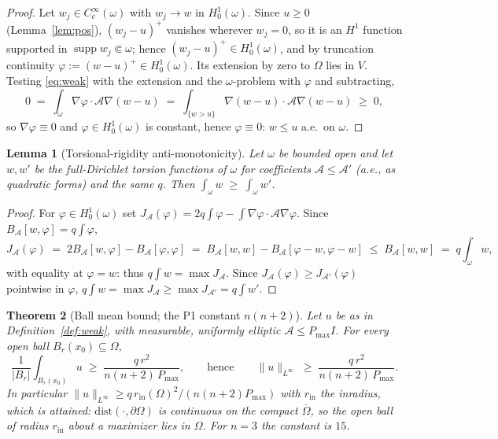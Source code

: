 \documentclass[10pt]{article}
\newtheorem{theorem}{Theorem}[section]
\newtheorem{lemma}[theorem]{Lemma}
\theoremstyle{remark}
\newcommand{\A}{\mathcal{A}}
\newcommand{\Om}{\Omega}
\newcommand{\Pmax}{P_{\max}}
\newcommand{\norminf}[1]{\|#1\|_{L^\infty}}
\begin{document}
\begin{proof}
Let $w_j\in C_c^\infty(\omega)$ with $w_j\to w$ in $H^1_0(\omega)$. Since
$u\ge0$ (Lemma~\ref{lem:pos}), $(w_j-u)^+$ vanishes wherever $w_j=0$, so it is
an $H^1$ function supported in $\operatorname{supp}w_j\Subset\omega$; hence
$(w_j-u)^+\in H^1_0(\omega)$, and by truncation continuity
$\varphi:=(w-u)^+\in H^1_0(\omega)$. Its extension by zero to $\Om$ lies in
$V$. Testing \eqref{eq:weak} with the extension and the $\omega$-problem with
$\varphi$ and subtracting,
\[
0\;=\;\int_\omega\nabla\varphi\cdot\A\nabla(w-u)
\;=\;\int_{\{w>u\}}\nabla(w-u)\cdot\A\nabla(w-u)\;\ge\;0,
\]
so $\nabla\varphi\equiv0$ and $\varphi\in H^1_0(\omega)$ is constant, hence
$\varphi\equiv0$: $w\le u$ a.e.\ on $\omega$.
\end{proof}

\begin{lemma}[Torsional-rigidity anti-monotonicity]\label{lem:rigidity}
Let $\omega$ be bounded open and let $w,w'$ be the full-Dirichlet torsion
functions of $\omega$ for coefficients $\A\le\A'$ (a.e., as quadratic forms)
and the same $q$. Then $\int_\omega w\;\ge\;\int_\omega w'$.
\end{lemma}

\begin{proof}
For $\varphi\in H^1_0(\omega)$ set
$J_{\A}(\varphi)=2q\int\varphi-\int\nabla\varphi\cdot\A\nabla\varphi$. Since
$B_\A[w,\varphi]=q\int\varphi$,
\[
J_\A(\varphi)\;=\;2B_\A[w,\varphi]-B_\A[\varphi,\varphi]
\;=\;B_\A[w,w]-B_\A[\varphi-w,\varphi-w]
\;\le\;B_\A[w,w]\;=\;q\int_\omega w ,
\]
with equality at $\varphi=w$: thus $q\int w=\max J_\A$. Since
$J_\A(\varphi)\ge J_{\A'}(\varphi)$ pointwise in $\varphi$,
$q\int w=\max J_\A\ge\max J_{\A'}=q\int w'$.
\end{proof}

\begin{theorem}[Ball mean bound; the P1 constant $n(n+2)$]\label{thm:P1}
Let $u$ be as in Definition~\ref{def:weak}, with measurable, uniformly
elliptic $\A\le\Pmax I$. For every open ball $B_r(x_0)\subseteq\Om$,
\[
\frac{1}{|B_r|}\int_{B_r(x_0)}u\;\ge\;\frac{q\,r^2}{n(n+2)\,\Pmax},
\qquad\text{hence}\qquad
\norminf{u}\;\ge\;\frac{q\,r^2}{n(n+2)\,\Pmax}.
\]
In particular $\norminf{u}\ge q\,r_{\mathrm{in}}(\Om)^2/(n(n+2)\Pmax)$ with
$r_{\mathrm{in}}$ the inradius, which is attained:
$\mathrm{dist}(\cdot,\partial\Om)$ is continuous on the compact
$\overline\Om$, so the open ball of radius $r_{\mathrm{in}}$ about a maximizer
lies in $\Om$. For $n=3$ the constant is $15$.
\end{theorem}
\end{document}
